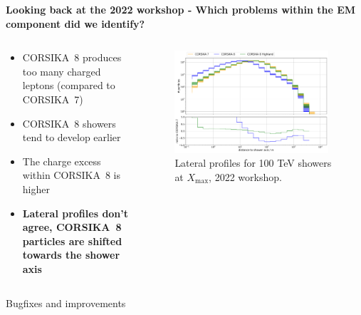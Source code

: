 \documentclass[aspectratio=1610, 9pt]{beamer}
\begin{document}
\begin{frame}

\textbf{Looking back at the 2022 workshop - Which problems within the EM component did we identify?}

    \begin{columns}[onlytextwidth]
        \begin{column}{0.5\textwidth}
            \begin{itemize}
              \item CORSIKA~8 produces too many charged leptons (compared to CORSIKA~7)
              \item CORSIKA~8 showers tend to develop earlier
              \item The charge excess within CORSIKA~8 is higher
              \item \textbf{Lateral profiles don't agree, CORSIKA~8 particles are shifted towards the shower axis}
            \end{itemize}
        \end{column}
        \begin{column}{0.5\textwidth}
            \begin{figure}
                \centering
                \includegraphics[width=0.95\textwidth]{plots/lateral_r_charged_2022.png}
                \caption{Lateral profiles for 100 \si{\tera\electronvolt} showers at $X_\text{max}$, 2022 workshop.}
            \end{figure}
        \end{column}
    \end{columns}
\end{frame}


\begin{frame}
  \begin{center}
    \Huge Bugfixes and improvements
  \end{center}
\end{frame}
\end{document}
